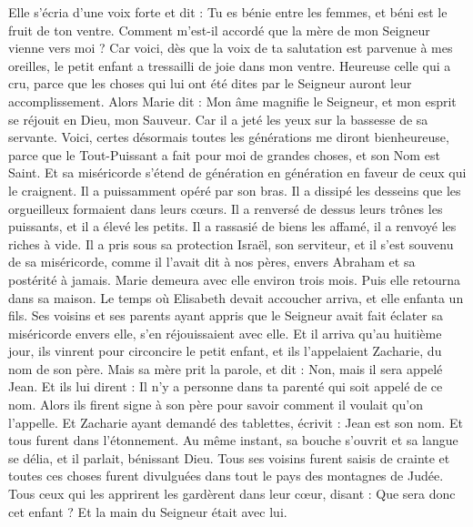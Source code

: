 \begin{multicols}{2}
Elle s'écria d'une voix forte et dit : Tu es bénie entre les femmes, et béni est le fruit de ton ventre.
Comment m'est-il accordé que la mère de mon Seigneur vienne vers moi ?
Car voici, dès que la voix de ta salutation est parvenue à mes oreilles, le petit enfant a tressailli de joie dans mon ventre.
Heureuse celle qui a cru, parce que les choses qui lui ont été dites par le Seigneur auront leur accomplissement.
Alors Marie dit : Mon âme magnifie le Seigneur,
et mon esprit se réjouit en Dieu, mon Sauveur.
Car il a jeté les yeux sur la bassesse de sa servante. Voici, certes désormais toutes les générations me diront bienheureuse,
parce que le Tout-Puissant a fait pour moi de grandes choses, et son Nom est Saint.
Et sa miséricorde s'étend de génération en génération en faveur de ceux qui le craignent.
Il a puissamment opéré par son bras. Il a dissipé les desseins que les orgueilleux formaient dans leurs cœurs.
Il a renversé de dessus leurs trônes les puissants, et il a élevé les petits.
Il a rassasié de biens les affamé, il a renvoyé les riches à vide.
Il a pris sous sa protection Israël, son serviteur, et il s'est souvenu de sa miséricorde,
comme il l'avait dit à nos pères, envers Abraham et sa postérité à jamais.
Marie demeura avec elle environ trois mois. Puis elle retourna dans sa maison.
Le temps où Elisabeth devait accoucher arriva, et elle enfanta un fils.
Ses voisins et ses parents ayant appris que le Seigneur avait fait éclater sa miséricorde envers elle, s'en réjouissaient avec elle.
Et il arriva qu'au huitième jour, ils vinrent pour circoncire le petit enfant, et ils l'appelaient Zacharie, du nom de son père.
Mais sa mère prit la parole, et dit : Non, mais il sera appelé Jean.
Et ils lui dirent : Il n'y a personne dans ta parenté qui soit appelé de ce nom.
Alors ils firent signe à son père pour savoir comment il voulait qu'on l'appelle.
Et Zacharie ayant demandé des tablettes, écrivit : Jean est son nom. Et tous furent dans l'étonnement.
Au même instant, sa bouche s'ouvrit et sa langue se délia, et il parlait, bénissant Dieu.
Tous ses voisins furent saisis de crainte et toutes ces choses furent divulguées dans tout le pays des montagnes de Judée.
Tous ceux qui les apprirent les gardèrent dans leur cœur, disant : Que sera donc cet enfant ? Et la main du Seigneur était avec lui.

\end{multicols}

